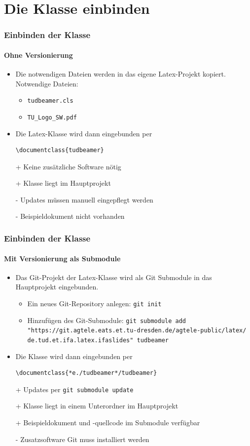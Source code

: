 \documentclass[german,notoc]{tudbeamer}%
\begin{document}
\section{Die Klasse einbinden}
\begin{frame}[fragile]
	\frametitle{Einbinden der Klasse}
	\framesubtitle{Ohne Versionierung}

	\begin{itemize}
		\item Die notwendigen Dateien werden in das eigene Latex-Projekt kopiert. Notwendige Dateien:
		\begin{itemize}
		 	\item \texttt{tudbeamer.cls}
		 	\item \texttt{TU\_Logo\_SW.pdf}
		\end{itemize}
		\item Die Latex-Klasse wird dann eingebunden per
			\begin{lstlisting}[gobble=8,style=latex,numbers=none]
				\documentclass{tudbeamer}
			\end{lstlisting}
	\end{itemize}
	\begin{itemize}
		\item[+] Keine zusätzliche Software nötig
		\item[+] Klasse liegt im Hauptprojekt
		\item[-] Updates müssen manuell eingepflegt werden
		\item[-] Beispieldokument nicht vorhanden
	\end{itemize}
\end{frame}
\begin{frame}[fragile]
	\frametitle{Einbinden der Klasse}
	\framesubtitle{Mit Versionierung als Submodule}
	\begin{itemize}
		\item Das Git-Projekt der Latex-Klasse wird als Git Submodule in das Hauptprojekt eingebunden.
		\begin{itemize}
			\item Ein neues Git-Repository anlegen: \texttt{git init}
			\item Hinzufügen des Git-Submodule: \texttt{git submodule add "https://git.agtele.eats.et.tu-dresden.de/agtele-public/latex/ de.tud.et.ifa.latex.ifaslides" tudbeamer}
		\end{itemize}
		\item Die Klasse wird dann eingebunden per
			\begin{lstlisting}[gobble=8,style=latex,numbers=none]
				\documentclass{*e./tudbeamer*/tudbeamer}
			\end{lstlisting}
	\end{itemize}	
	\begin{itemize}
		\item[+] Updates per \texttt{git submodule update}
		\item[+] Klasse liegt in einem Unterordner im Hauptprojekt
		\item[+] Beispieldokument und -quellcode im Submodule verfügbar
		\item[-] Zusatzsoftware Git muss installiert werden
	\end{itemize}
\end{frame}
\end{document}
